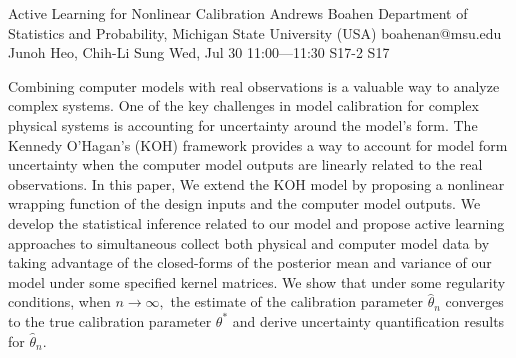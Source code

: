 \begin{talk}
  {Active Learning for Nonlinear Calibration}%
  {Andrews Boahen}%
  {Department of Statistics and Probability, Michigan State University (USA)}%
  {boahenan@msu.edu}%
  {Junoh Heo, Chih-Li Sung}%
  {}%
  {Wed, Jul 30 11:00---11:30}%
  {S17-2}%
  {S17}%
  
    
   
Combining computer models with real observations is a valuable way to analyze complex systems. One of the key challenges in model calibration for complex physical systems is accounting for uncertainty around the model's form. The Kennedy O'Hagan's (KOH) framework provides a way to account for model form uncertainty when the computer model outputs are linearly related to the real observations. In this paper, We extend the KOH model by proposing a nonlinear wrapping function of the design inputs and the computer model outputs. We develop the statistical inference related to our model and propose active learning approaches to simultaneous collect both physical and computer model data by taking advantage of the closed-forms of the posterior mean and variance of our model under some specified kernel matrices. We show that under some regularity conditions, when $n\rightarrow\infty,$ the estimate of the calibration parameter $\hat{\theta}_n$ converges  to  the true calibration parameter $\theta^*$ and derive uncertainty quantification results for $\hat{\theta}_n.$
\medskip


\end{talk}


